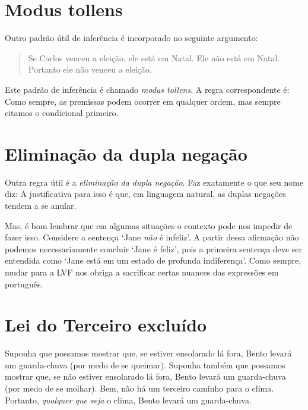 \section{Modus tollens}
Outro padrão  útil de inferência é incorporado no seguinte argumento:
	\begin{quote}
		Se Carlos venceu a eleição, ele está em Natal. Ele não está em Natal. Portanto ele não venceu a eleição.
	\end{quote}
Este padrão de inferência é chamado \emph{modus tollens}. A regra correspondente é:
Como sempre, as premissas podem ocorrer em qualquer ordem, mas sempre citamos o condicional primeiro. 

\section{Eliminação da dupla negação}
Outra regra  útil é a  \emph{eliminação da dupla negação}. Faz exatamente o que seu nome diz:
A justificativa para isso é que, em linguagem natural, as duplas negações tendem a se anular.

Mas, é bom lembrar que em algumas situações o contexto pode nos impedir de fazer isso. Considere a sentença `Jane \emph{não} é infeliz’.  A partir dessa afirmação  não podemos necessariamente concluir `Jane é feliz’, pois a primeira sentença deve ser entendida como  `Jane está em um estado de profunda indiferença’. 
  Como sempre, mudar para a LVF nos obriga a sacrificar certas nuances das expressões em português. 

\section{Lei do Terceiro excluído}

Suponha que possamos mostrar que, se estiver ensolarado lá fora, Bento levará um guarda-chuva (por medo de se queimar). Suponha   também que possamos mostrar que, se não estiver ensolarado lá fora, Bento levará um guarda-chuva (por medo de se molhar). Bem, não há um terceiro caminho para o clima. Portanto, \emph{qualquer que seja} o clima, Bento levará um guarda-chuva.

